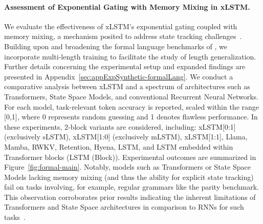 \paragraph{Assessment of Exponential Gating with Memory Mixing in xLSTM.} We evaluate the effectiveness of xLSTM’s exponential gating coupled with memory mixing, a mechanism posited to address state tracking challenges~\citep{Merrill:24, Merrill:23}. Building upon and broadening the formal language benchmarks of \citet{Deletang:23}, we incorporate multi-length training to facilitate the study of length generalization. Further details concerning the experimental setup and expanded findings are presented in Appendix~\ref{sec:appExpSynthetic-formalLang}. We conduct a comparative analysis between xLSTM and a spectrum of architectures such as Transformers, State Space Models, and conventional Recurrent Neural Networks. For each model, task-relevant token accuracy is reported, scaled within the range [0,1], where 0 represents random guessing and 1 denotes flawless performance. In these experiments, 2-block variants are considered, including: xLSTM[0:1] (exclusively sLSTM), xLSTM[1:0] (exclusively mLSTM), xLSTM[1:1], Llama, Mamba, RWKV, Retention, Hyena, LSTM, and LSTM embedded within Transformer blocks (LSTM (Block)). Experimental outcomes are summarized in Figure~\ref{fig:formal-main}. Notably, models such as Transformers or State Space Models lacking memory mixing (and thus the ability for explicit state tracking) fail on tasks involving, for example, regular grammars like the parity benchmark. This observation corroborates prior results indicating the inherent limitations of Transformers and State Space architectures in comparison to RNNs for such tasks~\citep{Merrill:24, Merrill:23, Deletang:23}.

